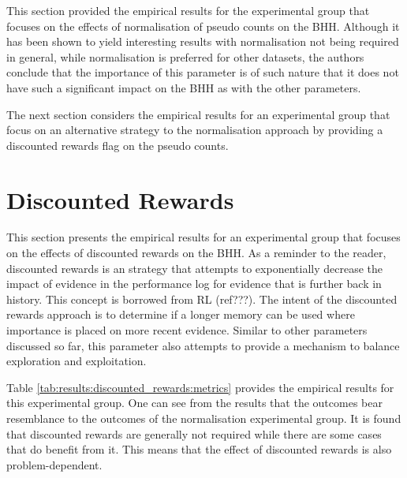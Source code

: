This section provided the empirical results for the experimental group that focuses on the effects of normalisation of pseudo counts on the \Ac{BHH}. Although it has been shown to yield interesting results with normalisation not being required in general, while normalisation is preferred for other datasets, the authors conclude that the importance of this parameter is of such nature that it does not have such a significant impact on the \Ac{BHH} as with the other parameters. 

The next section considers the empirical results for an experimental group that focus on an alternative strategy to the normalisation approach by providing a discounted rewards flag on the pseudo counts.
















\section{Discounted Rewards}
\label{sec:results:discounted_rewards}

This section presents the empirical results for an experimental group that focuses on the effects of discounted rewards on the \Ac{BHH}. As a reminder to the reader, discounted rewards is an strategy that attempts to exponentially decrease the impact of evidence in the performance log for evidence that is further back in history. This concept is borrowed from \Ac{RL} (ref???). The intent of the discounted rewards approach is to determine if a longer memory can be used where importance is placed on more recent evidence. Similar to other parameters discussed so far, this parameter also attempts to provide a mechanism to balance exploration and exploitation.

Table \ref{tab:results:discounted_rewards:metrics} provides the empirical results for this experimental group. One can see from the results that the outcomes bear resemblance to the outcomes of the normalisation experimental group. It is found that discounted rewards are generally not required while there are some cases that do benefit from it. This means that the effect of discounted rewards is also problem-dependent.

